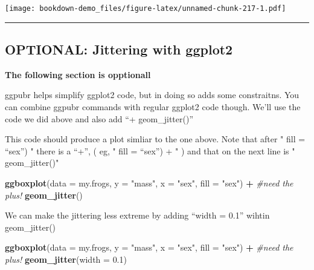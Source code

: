 \documentclass[]{book}
\newenvironment{Shaded}{\begin{snugshade}}{\end{snugshade}}
\newcommand{\KeywordTok}[1]{\textcolor[rgb]{0.13,0.29,0.53}{\textbf{#1}}}
\newcommand{\DataTypeTok}[1]{\textcolor[rgb]{0.13,0.29,0.53}{#1}}
\newcommand{\FloatTok}[1]{\textcolor[rgb]{0.00,0.00,0.81}{#1}}
\newcommand{\StringTok}[1]{\textcolor[rgb]{0.31,0.60,0.02}{#1}}
\newcommand{\CommentTok}[1]{\textcolor[rgb]{0.56,0.35,0.01}{\textit{#1}}}
\newcommand{\OperatorTok}[1]{\textcolor[rgb]{0.81,0.36,0.00}{\textbf{#1}}}
\newcommand{\NormalTok}[1]{#1}
\theoremstyle{definition}
\theoremstyle{definition}
\theoremstyle{definition}
\theoremstyle{remark}
\begin{document}
\texttt{[image: bookdown-demo\_files/figure-latex/unnamed-chunk-217-1.pdf]}

\begin{center}\rule{0.5\linewidth}{\linethickness}\end{center}

\subsection{OPTIONAL: Jittering with
ggplot2}\label{optional-jittering-with-ggplot2}

\textbf{The following section is opptionall}

ggpubr helps simplify ggplot2 code, but in doing so adds some
constraitns. You can combine ggpubr commands with regular ggplot2 code
though. We'll use the code we did above and also add ``+
geom\_jitter()''

This code should produce a plot simliar to the one above. Note that
after " fill = ``sex'') " there is a ``+'', ( eg, " fill = ``sex'') + "
) and that on the next line is " geom\_jitter()"

\begin{Shaded}
\begin{Highlighting}[]
\KeywordTok{ggboxplot}\NormalTok{(}\DataTypeTok{data =}\NormalTok{ my.frogs,}
          \DataTypeTok{y =} \StringTok{"mass"}\NormalTok{,}
          \DataTypeTok{x =} \StringTok{"sex"}\NormalTok{,}
          \DataTypeTok{fill =} \StringTok{"sex"}\NormalTok{) }\OperatorTok{+}\StringTok{  }\CommentTok{#need the plus!}
\StringTok{  }\KeywordTok{geom_jitter}\NormalTok{()}
\end{Highlighting}
\end{Shaded}

We can make the jittering less extreme by adding ``width = 0.1'' wihtin
geom\_jitter()

\begin{Shaded}
\begin{Highlighting}[]
\KeywordTok{ggboxplot}\NormalTok{(}\DataTypeTok{data =}\NormalTok{ my.frogs,}
          \DataTypeTok{y =} \StringTok{"mass"}\NormalTok{,}
          \DataTypeTok{x =} \StringTok{"sex"}\NormalTok{,}
          \DataTypeTok{fill =} \StringTok{"sex"}\NormalTok{) }\OperatorTok{+}\StringTok{  }\CommentTok{#need the plus!}
\StringTok{  }\KeywordTok{geom_jitter}\NormalTok{(}\DataTypeTok{width =} \FloatTok{0.1}\NormalTok{)}
\end{Highlighting}
\end{Shaded}
\end{document}
